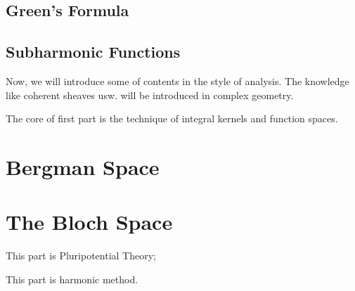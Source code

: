 \documentclass[Total.tex]{subfiles}
\begin{document}
		\section{Green's Formula}
		\section{Subharmonic Functions}
	\newpage Now, we will introduce some of contents in the style of analysis. The knowledge like coherent sheaves usw. will be introduced in complex geometry.
	
	The core of first part is the technique of integral kernels and function spaces.	
	\chapter{Bergman Space}
	
	\chapter{The Bloch Space}
	
	
	\newpage This part is Pluripotential Theory;
	
	\newpage This part is harmonic method.
\end{document}
